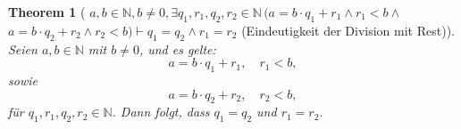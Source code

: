 \documentclass{book}
\theoremstyle{plain}
\newtheorem{theorem}{Theorem}
\theoremstyle{remark}
\theoremstyle{definition}
\begin{document}
\label{awbInNaturalwbNotEqualsZerowExqSubOnewrSubOnewqSubTwowrSubTwoInNaturalLpaEqualsbMultqSubOnePlusrSubOneAndrSubOneLneqbAndaEqualsbMultqSubTwoPlusrSubTwoAndrSubTwoLneqbRpImpqSubOneEqualsqSubTwoAndrSubOneEqualsrSubTwo}
\begin{theorem}[
\(
a,b\in\mathbb{N},b\neq 0,\exists q_1, r_1, q_2, r_2 \in \mathbb{N} \,
\big(
a = b \cdot q_1 + r_1 \land r_1 < b \land 
\)
\newline
\(
a = b \cdot q_2 + r_2 \land r_2 < b
\big)
\vdash q_1 = q_2 \land r_1 = r_2
\)
(Eindeutigkeit der Division mit Rest)]
Seien \( a, b \in \mathbb{N} \) mit \( b \neq 0 \), und es gelte:
\[
a = b \cdot q_1 + r_1, \quad r_1 < b,
\]
sowie
\[
a = b \cdot q_2 + r_2, \quad r_2 < b,
\]
für \( q_1, r_1, q_2, r_2 \in \mathbb{N} \). Dann folgt, dass \( q_1 = q_2 \) und \( r_1 = r_2 \).
\end{theorem}
\end{document}
